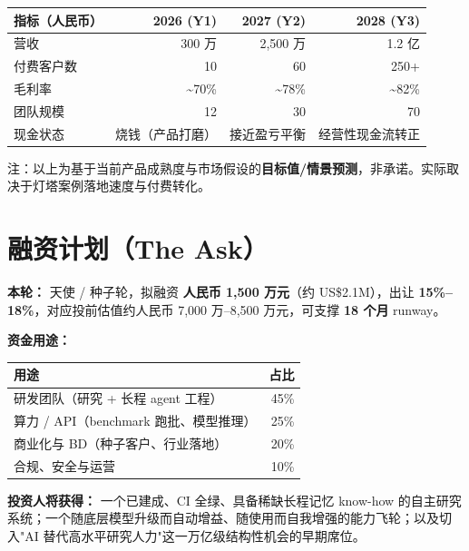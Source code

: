 \documentclass[UTF8,11pt,fontset=none]{ctexart}
\newcommand{\hl}[1]{\textbf{\color{argusnavy}#1}}
\newcommand{\thd}[1]{\textbf{\color{white}#1}}
\newcommand{\headrow}{\rowcolor{argusnavy}}
\newcommand{\altrow}{\rowcolor{arguslight}}
\begin{document}
\begin{tabularx}{\textwidth}{@{}X r r r@{}}
\toprule
\headrow \thd{指标（人民币）} & \thd{2026 (Y1)} & \thd{2027 (Y2)} & \thd{2028 (Y3)} \\
\midrule
\altrow 营收 & 300 万 & 2,500 万 & 1.2 亿 \\
付费客户数 & 10 & 60 & 250+ \\
\altrow 毛利率 & \textasciitilde 70\% & \textasciitilde 78\% & \textasciitilde 82\% \\
团队规模 & 12 & 30 & 70 \\
\altrow 现金状态 & 烧钱（产品打磨） & 接近盈亏平衡 & 经营性现金流转正 \\
\bottomrule
\end{tabularx}

\footnotesize\color{argusgray}注：以上为基于当前产品成熟度与市场假设的\textbf{目标值/情景预测}，非承诺。实际取决于灯塔案例落地速度与付费转化。\normalsize\color{black}

\section{融资计划（The Ask）}

\begin{keybox}
\textbf{本轮：} 天使 / 种子轮，拟融资 \hl{人民币 1,500 万元}（约 US\$2.1M），出让 \hl{15\%–18\%}，对应投前估值约人民币 7,000 万–8,500 万元，可支撑 \hl{18 个月} runway。
\end{keybox}

\textbf{资金用途：}
\begin{tabularx}{\textwidth}{@{}X r@{}}
\toprule
\headrow \thd{用途} & \thd{占比} \\
\midrule
\altrow 研发团队（研究 + 长程 agent 工程） & 45\% \\
算力 / API（benchmark 跑批、模型推理） & 25\% \\
\altrow 商业化与 BD（种子客户、行业落地） & 20\% \\
合规、安全与运营 & 10\% \\
\bottomrule
\end{tabularx}

\textbf{投资人将获得：} 一个已建成、CI 全绿、具备稀缺长程记忆 know-how 的自主研究系统；一个随底层模型升级而自动增益、随使用而自我增强的能力飞轮；以及切入"AI 替代高水平研究人力"这一万亿级结构性机会的早期席位。
\end{document}
